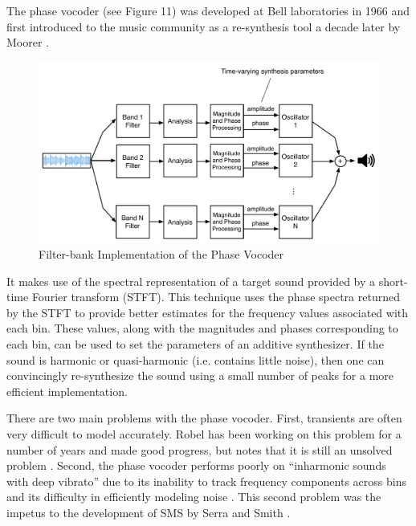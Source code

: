 \documentclass[12pt]{report} 	%
\numberwithin{figure}{chapter}
\numberwithin{table}{chapter}
\numberwithin{equation}{chapter}
\begin{document}
\begin{flushleft}
The phase vocoder (see Figure 11) was developed at Bell laboratories in 1966 and first introduced to the music community as a re-synthesis tool a decade later by Moorer \cite{Moorer:1978ge}. \begin{figure}[h!]
\begin{center}
\includegraphics[scale=0.45]{PhaseVocoder}
\caption[Phase vocoder]{Filter-bank Implementation of the Phase Vocoder}
\end{center}
\end{figure}
It makes use of the spectral representation of a target sound provided by a short-time Fourier transform (STFT). This technique uses the phase spectra returned by the STFT to provide better estimates for the frequency values associated with each bin. These values, along with the magnitudes and phases corresponding to each bin, can be used to set the parameters of an additive synthesizer. If the sound is harmonic or quasi-harmonic (i.e. contains little noise), then one can convincingly re-synthesize the sound using a small number of peaks for a more efficient implementation. 

There are two main problems with the phase vocoder. First, transients are often very difficult to model accurately. Robel has been working on this problem for a number of years \cite{Robel:2003vh,Robel:2010dp} and made good progress, but notes that it is still an unsolved problem \cite[p. 1]{Robel:2010dp}. Second, the phase vocoder performs poorly on ``inharmonic sounds with deep vibrato'' due to its inability to track frequency components across bins and its difficulty in efficiently modeling noise \cite[p. 13]{Serra:1990dk}. This second problem was the impetus to the development of SMS by Serra and Smith \cite{Serra:1990dk}.


\end{flushleft}
\end{document}
